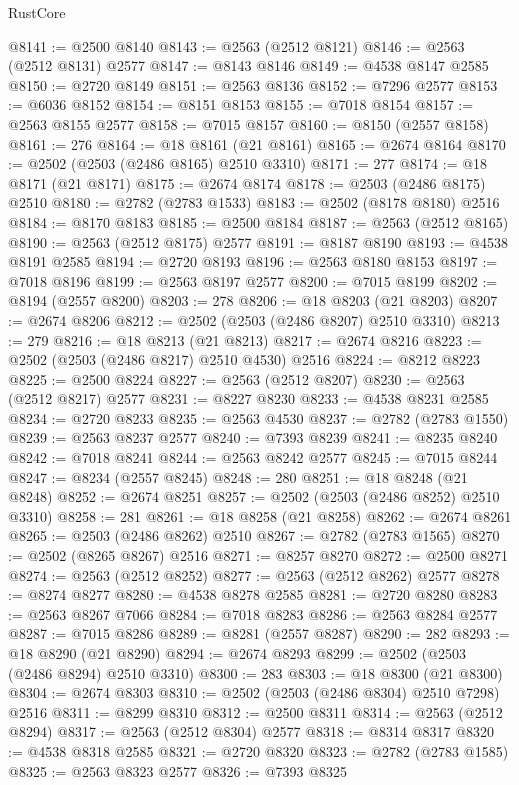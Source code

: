 \begin{lexlean}{RustCore}
\begin{coremodule}
@8141 := @2500 @8140
@8143 := @2563 (@2512 @8121)
@8146 := @2563 (@2512 @8131) @2577
@8147 := @8143 @8146
@8149 := @4538 @8147 @2585
@8150 := @2720 @8149
@8151 := @2563 @8136
@8152 := @7296 @2577
@8153 := @6036 @8152
@8154 := @8151 @8153
@8155 := @7018 @8154
@8157 := @2563 @8155 @2577
@8158 := @7015 @8157
@8160 := @8150 (@2557 @8158)
@8161 := 276
@8164 := @18 @8161 (@21 @8161)
@8165 := @2674 @8164
@8170 := @2502 (@2503 (@2486 @8165) @2510 @3310)
@8171 := 277
@8174 := @18 @8171 (@21 @8171)
@8175 := @2674 @8174
@8178 := @2503 (@2486 @8175) @2510
@8180 := @2782 (@2783 @1533)
@8183 := @2502 (@8178 @8180) @2516
@8184 := @8170 @8183
@8185 := @2500 @8184
@8187 := @2563 (@2512 @8165)
@8190 := @2563 (@2512 @8175) @2577
@8191 := @8187 @8190
@8193 := @4538 @8191 @2585
@8194 := @2720 @8193
@8196 := @2563 @8180 @8153
@8197 := @7018 @8196
@8199 := @2563 @8197 @2577
@8200 := @7015 @8199
@8202 := @8194 (@2557 @8200)
@8203 := 278
@8206 := @18 @8203 (@21 @8203)
@8207 := @2674 @8206
@8212 := @2502 (@2503 (@2486 @8207) @2510 @3310)
@8213 := 279
@8216 := @18 @8213 (@21 @8213)
@8217 := @2674 @8216
@8223 := @2502 (@2503 (@2486 @8217) @2510 @4530) @2516
@8224 := @8212 @8223
@8225 := @2500 @8224
@8227 := @2563 (@2512 @8207)
@8230 := @2563 (@2512 @8217) @2577
@8231 := @8227 @8230
@8233 := @4538 @8231 @2585
@8234 := @2720 @8233
@8235 := @2563 @4530
@8237 := @2782 (@2783 @1550)
@8239 := @2563 @8237 @2577
@8240 := @7393 @8239
@8241 := @8235 @8240
@8242 := @7018 @8241
@8244 := @2563 @8242 @2577
@8245 := @7015 @8244
@8247 := @8234 (@2557 @8245)
@8248 := 280
@8251 := @18 @8248 (@21 @8248)
@8252 := @2674 @8251
@8257 := @2502 (@2503 (@2486 @8252) @2510 @3310)
@8258 := 281
@8261 := @18 @8258 (@21 @8258)
@8262 := @2674 @8261
@8265 := @2503 (@2486 @8262) @2510
@8267 := @2782 (@2783 @1565)
@8270 := @2502 (@8265 @8267) @2516
@8271 := @8257 @8270
@8272 := @2500 @8271
@8274 := @2563 (@2512 @8252)
@8277 := @2563 (@2512 @8262) @2577
@8278 := @8274 @8277
@8280 := @4538 @8278 @2585
@8281 := @2720 @8280
@8283 := @2563 @8267 @7066
@8284 := @7018 @8283
@8286 := @2563 @8284 @2577
@8287 := @7015 @8286
@8289 := @8281 (@2557 @8287)
@8290 := 282
@8293 := @18 @8290 (@21 @8290)
@8294 := @2674 @8293
@8299 := @2502 (@2503 (@2486 @8294) @2510 @3310)
@8300 := 283
@8303 := @18 @8300 (@21 @8300)
@8304 := @2674 @8303
@8310 := @2502 (@2503 (@2486 @8304) @2510 @7298) @2516
@8311 := @8299 @8310
@8312 := @2500 @8311
@8314 := @2563 (@2512 @8294)
@8317 := @2563 (@2512 @8304) @2577
@8318 := @8314 @8317
@8320 := @4538 @8318 @2585
@8321 := @2720 @8320
@8323 := @2782 (@2783 @1585)
@8325 := @2563 @8323 @2577
@8326 := @7393 @8325

\end{coremodule}
\end{lexlean}
